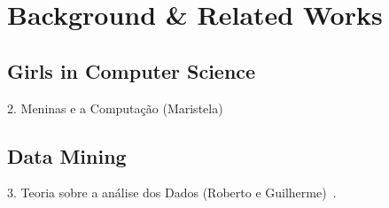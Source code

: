\section{Background \& Related Works}\label{sec:background}%

\subsection{Girls in Computer Science}\label{subsec:girls}%
2. Meninas e a Computação (Maristela)

\subsection{Data Mining}\label{subsec:mining}%
3. Teoria sobre a análise dos Dados (Roberto e Guilherme)~\cite{Cios2007}.


